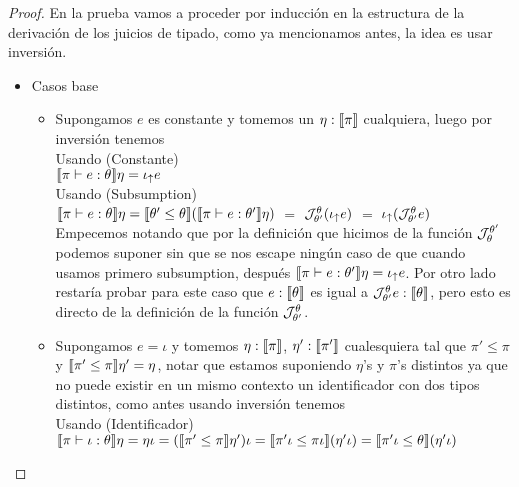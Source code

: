\begin{proof}
En la prueba vamos a proceder por inducci\'on en la estructura de la derivaci\'on 
de los juicios de tipado, como ya mencionamos antes, la idea es usar inversi\'on.\\

\begin{itemize}

\item Casos base
\begin{itemize}
\item Supongamos $e$ es constante y tomemos un $\eta : \llbracket \pi \rrbracket$ cualquiera, 
luego por inversi\'on tenemos\\

Usando (Constante)\\

$\llbracket \pi \vdash e : \theta \rrbracket\eta = \iota_{\uparrow} e$\\

Usando (Subsumption)\\

$\llbracket \pi \vdash e : \theta \rrbracket\eta = 
\llbracket \theta' \leq \theta \rrbracket(\llbracket \pi \vdash e : \theta' \rrbracket\eta)$ $=$
$\mathcal{J}_{\theta'}^{\theta} (\iota_{\uparrow} e)$ $=$ $\iota_{\uparrow} (\mathcal{J}_{\theta'}^{\theta} e)$\\

Empecemos notando que por la definici\'on que hicimos de la funci\'on $\mathcal{J}_{\theta}^{\theta'}$
podemos suponer sin que se nos escape ning\'un caso de que cuando usamos primero
subsumption, despu\'es $\llbracket \pi \vdash e : \theta' \rrbracket\eta = \iota_{\uparrow} e$. Por otro lado
restar\'ia probar para este caso que $e : \llbracket \theta \rrbracket$  es igual a 
$\mathcal{J}_{\theta'}^{\theta} e : \llbracket \theta \rrbracket$, pero esto es directo de la definici\'on
de la funci\'on $\mathcal{J}_{\theta'}^{\theta}$.\\

\item Supongamos $e = \iota$ y tomemos $\eta : \llbracket \pi \rrbracket$, $\eta' : \llbracket \pi' \rrbracket$
cualesquiera tal que $\pi' \leq \pi$ y $\llbracket \pi' \leq  \pi \rrbracket\eta' = \eta$, 
notar que estamos suponiendo $\eta$'s y $\pi$'s distintos ya que 
no puede existir en un mismo contexto un identificador con dos tipos distintos, como 
antes usando inversi\'on tenemos\\

Usando (Identificador)\\

$\llbracket \pi \vdash \iota : \theta \rrbracket\eta = \eta \iota = (\llbracket \pi' \leq \pi \rrbracket\eta')\iota = 
\llbracket \pi'\iota \leq \pi\iota \rrbracket(\eta' \iota) = \llbracket \pi'\iota \leq \theta \rrbracket(\eta' \iota)$\\


\end{itemize}
\end{itemize}
\end{proof}
